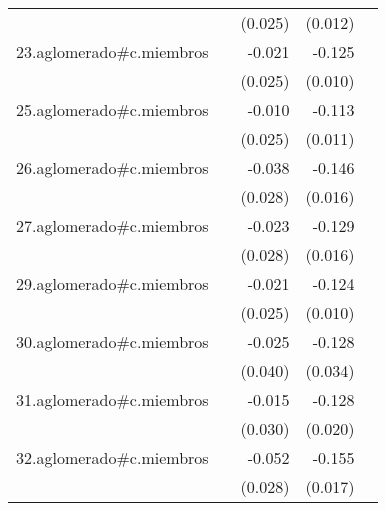 {\begin{longtable}{l*{4}{D{.}{.}{-1}}}
            &                     &     (0.025)         &     (0.012)         &                     \\
\addlinespace
23.aglomerado#c.miembros&                     &      -0.021         &      -0.125\sym{***}&                     \\
            &                     &     (0.025)         &     (0.010)         &                     \\
\addlinespace
25.aglomerado#c.miembros&                     &      -0.010         &      -0.113\sym{***}&                     \\
            &                     &     (0.025)         &     (0.011)         &                     \\
\addlinespace
26.aglomerado#c.miembros&                     &      -0.038         &      -0.146\sym{***}&                     \\
            &                     &     (0.028)         &     (0.016)         &                     \\
\addlinespace
27.aglomerado#c.miembros&                     &      -0.023         &      -0.129\sym{***}&                     \\
            &                     &     (0.028)         &     (0.016)         &                     \\
\addlinespace
29.aglomerado#c.miembros&                     &      -0.021         &      -0.124\sym{***}&                     \\
            &                     &     (0.025)         &     (0.010)         &                     \\
\addlinespace
30.aglomerado#c.miembros&                     &      -0.025         &      -0.128\sym{***}&                     \\
            &                     &     (0.040)         &     (0.034)         &                     \\
\addlinespace
31.aglomerado#c.miembros&                     &      -0.015         &      -0.128\sym{***}&                     \\
            &                     &     (0.030)         &     (0.020)         &                     \\
\addlinespace
32.aglomerado#c.miembros&                     &      -0.052         &      -0.155\sym{***}&                     \\
            &                     &     (0.028)         &     (0.017)         &                     \\

\end{longtable}}
